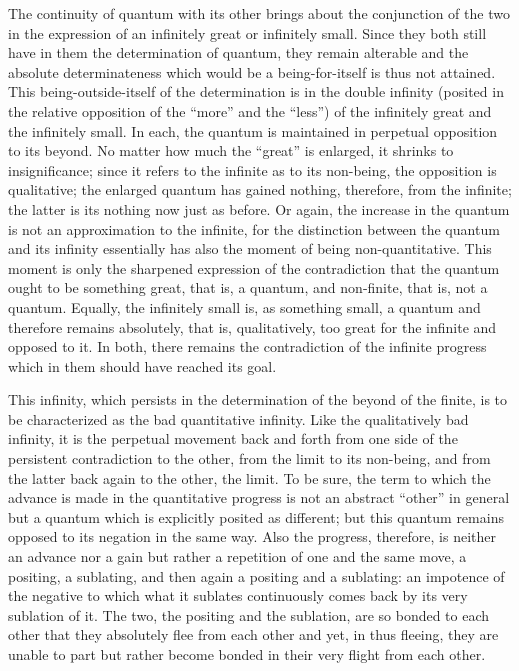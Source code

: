 The continuity of quantum with its other brings about
the conjunction of the two in the expression
of an infinitely great or infinitely small.
Since they both still have in them the determination of quantum,
they remain alterable and the absolute determinateness
which would be a being-for-itself is thus not attained.
This being-outside-itself of the determination is in the double infinity
(posited in the relative opposition of the “more” and the “less”)
of the infinitely great and the infinitely small.
In each, the quantum is maintained in perpetual opposition to its beyond.
No matter how much the “great” is enlarged, it shrinks to insignificance;
since it refers to the infinite as to its non-being,
the opposition is qualitative;
the enlarged quantum has gained nothing, therefore, from the infinite;
the latter is its nothing now just as before.
Or again, the increase in the quantum is not
an approximation to the infinite,
for the distinction between the quantum and its infinity
essentially has also the moment of being non-quantitative.
This moment is only the sharpened expression of the contradiction
that the quantum ought to be something great,
that is, a quantum, and non-finite, that is, not a quantum.
Equally, the infinitely small is, as something small,
a quantum and therefore remains absolutely, that is, qualitatively,
too great for the infinite and opposed to it.
In both, there remains the contradiction of the infinite progress
which in them should have reached its goal.

This infinity, which persists in the determination
of the beyond of the finite,
is to be characterized as the bad quantitative infinity.
Like the qualitatively bad infinity,
it is the perpetual movement back and forth
from one side of the persistent contradiction to the other,
from the limit to its non-being,
and from the latter back again to the other, the limit.
To be sure, the term to which the advance is made
in the quantitative progress is not an abstract “other” in general
but a quantum which is explicitly posited as different;
but this quantum remains opposed to its negation in the same way.
Also the progress, therefore, is neither an advance nor a gain
but rather a repetition of one and the same move, a positing, a sublating,
and then again a positing and a sublating:
an impotence of the negative to which what it sublates
continuously comes back by its very sublation of it.
The two, the positing and the sublation,
are so bonded to each other that
they absolutely flee from each other
and yet, in thus fleeing, they are unable to part
but rather become bonded in their very flight from each other.

